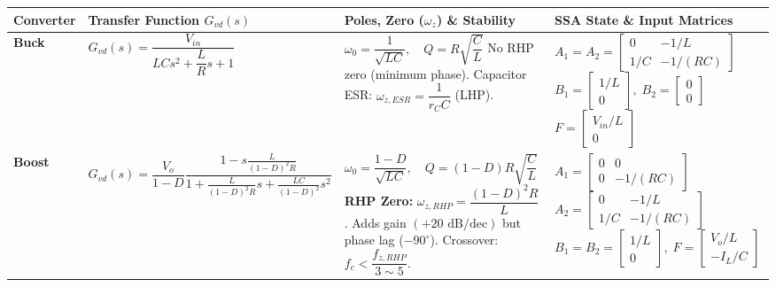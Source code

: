 \vspace{-2pt}
\begin{center}
\vspace{-4pt}
\footnotesize
\renewcommand{\arraystretch}{1.14}
\begin{tabularx}{\textwidth}{@{} l >{\raggedright\arraybackslash}p{5.4cm} >{\raggedright\arraybackslash}p{4.0cm} >{\raggedright\arraybackslash}X @{}}
\toprule
\textbf{Converter} & \textbf{Transfer Function $G_{vd}(s)$} & \textbf{Poles, Zero ($\omega_z$) \& Stability} & \textbf{SSA State \& Input Matrices} \\
\midrule
\textbf{Buck} &
$G_{vd}(s) = \dfrac{V_{in}}{L C s^2 + \dfrac{L}{R} s + 1}$ &
$\omega_0 = \dfrac{1}{\sqrt{LC}}, \quad Q = R\sqrt{\dfrac{C}{L}}$ \newline
No RHP zero (minimum phase). \newline
Capacitor ESR: $\omega_{z,ESR} = \dfrac{1}{r_C C}$ (LHP). &
$A_1 = A_2 = \begin{bmatrix} 0 & -1/L \\ 1/C & -1/(RC) \end{bmatrix}$ \newline
$B_1 = \begin{bmatrix} 1/L \\ 0 \end{bmatrix}, \; B_2 = \begin{bmatrix} 0 \\ 0 \end{bmatrix}$ \newline
$F = \begin{bmatrix} V_{in}/L \\ 0 \end{bmatrix}$ \\

\textbf{Boost} &
$G_{vd}(s) = \dfrac{V_o}{1-D} \dfrac{1 - s \frac{L}{(1-D)^2 R}}{1 + \frac{L}{(1-D)^2 R} s + \frac{LC}{(1-D)^2} s^2}$ &
$\omega_0 = \dfrac{1-D}{\sqrt{LC}}, \quad Q = (1-D) R \sqrt{\dfrac{C}{L}}$ \newline
\textbf{RHP Zero:} $\omega_{z,RHP} = \dfrac{(1-D)^2 R}{L}$. \newline
Adds gain $(+20\text{ dB/dec})$ but phase lag ($-90^\circ$). Crossover: $f_c < \dfrac{f_{z,RHP}}{3 \sim 5}$. &
$A_1 = \begin{bmatrix} 0 & 0 \\ 0 & -1/(RC) \end{bmatrix}$ \newline
$A_2 = \begin{bmatrix} 0 & -1/L \\ 1/C & -1/(RC) \end{bmatrix}$ \newline
$B_1 = B_2 = \begin{bmatrix} 1/L \\ 0 \end{bmatrix}, \; F = \begin{bmatrix} V_o/L \\ -I_L/C \end{bmatrix}$ \\


\end{tabularx}
\end{center}
